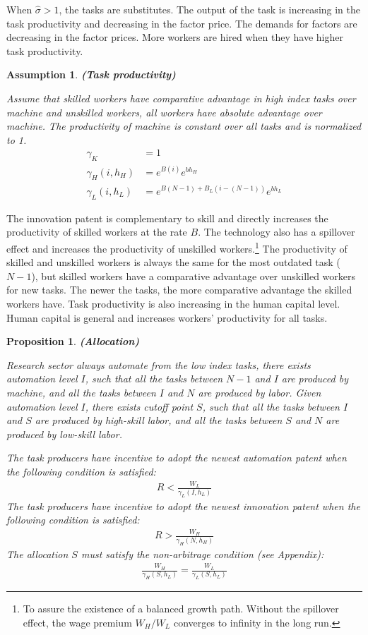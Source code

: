 \documentclass[12pt]{article}
\newtheorem{assumption}{Assumption}
\newtheorem{proposition}{Proposition}
\begin{document}
When $\hat{\sigma}>1$, the tasks are substitutes. The output of the task is increasing in the task productivity and decreasing in the factor price. The demands for factors are decreasing in the factor prices. More workers are hired when they have higher task productivity. 


\begin{assumption}{\bf (Task productivity)}

Assume that skilled workers have comparative advantage in high index tasks over machine and unskilled workers, all workers have absolute advantage over machine. The productivity of machine is constant over all tasks and is normalized to 1. 
\begin{align*}
\gamma_K &= 1 \\
\gamma_H(i,h_H) &=e^{B(i)} e^{bh_H} \\
\gamma_L(i,h_L) &= e^{B(N-1)+B_L(i-(N-1))} e^{bh_L}
\end{align*}
\end{assumption}

The innovation patent is complementary to skill and directly increases the productivity of skilled workers at the rate $B$. The technology also has a spillover effect and increases the productivity of unskilled workers.\footnote{To assure the existence of a balanced growth path. Without the spillover effect, the wage premium $W_H/W_L$ converges to infinity in the long run.} The productivity of skilled and unskilled workers is always the same for the most outdated task ($N-1$), but skilled workers have a comparative advantage over unskilled workers for new tasks. The newer the tasks, the more comparative advantage the skilled workers have. Task productivity is also increasing in the human capital level. Human capital is general and increases workers' productivity for all tasks.  


\begin{proposition}{\bf (Allocation)}

Research sector always automate from the low index tasks, there exists automation level $I$, such that all the tasks between $N-1$ and $I$ are produced by machine, and all the tasks between $I$ and $N$ are produced by labor. Given automation level $I$, there exists cutoff point $S$, such that all the tasks between $I$ and $S$ are produced by high-skill labor, and all the tasks between $S$ and $N$ are produced by low-skill labor. 

The task producers have incentive to adopt the newest automation patent when the following condition is satisfied:
\begin{align*}
R < \frac{W_L}{\gamma_L(I,h_L)}
\end{align*}
The task producers have incentive to adopt the newest innovation patent when the following condition is satisfied: 
\begin{align*}
R > \frac{W_H}{\gamma_H(N,h_H)}
\end{align*}
The allocation $S$ must satisfy the non-arbitrage condition (see Appendix): 
\begin{align*}
\frac{W_H}{\gamma_H(S,h_L)} = \frac{W_L}{\gamma_L(S,h_L)}
\end{align*}
\end{proposition}
\end{document}
